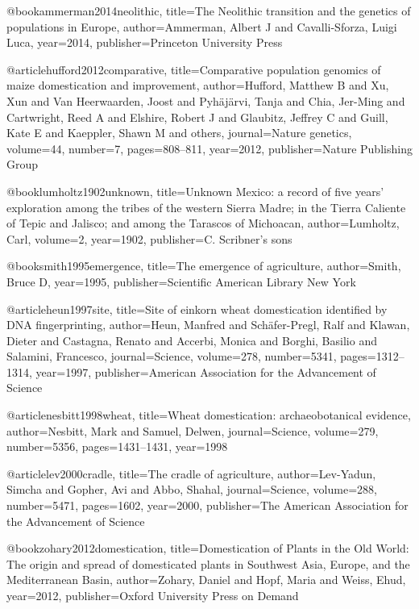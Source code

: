 @book{ammerman2014neolithic,
  title={The Neolithic transition and the genetics of populations in Europe},
  author={Ammerman, Albert J and Cavalli-Sforza, Luigi Luca},
  year={2014},
  publisher={Princeton University Press}
}

@article{hufford2012comparative,
  title={Comparative population genomics of maize domestication and improvement},
  author={Hufford, Matthew B and Xu, Xun and Van Heerwaarden, Joost and Pyh{\"a}j{\"a}rvi, Tanja and Chia, Jer-Ming and Cartwright, Reed A and Elshire, Robert J and Glaubitz, Jeffrey C and Guill, Kate E and Kaeppler, Shawn M and others},
  journal={Nature genetics},
  volume={44},
  number={7},
  pages={808--811},
  year={2012},
  publisher={Nature Publishing Group}
}

@book{lumholtz1902unknown,
  title={Unknown Mexico: a record of five years' exploration among the tribes of the western Sierra Madre; in the Tierra Caliente of Tepic and Jalisco; and among the Tarascos of Michoacan},
  author={Lumholtz, Carl},
  volume={2},
  year={1902},
  publisher={C. Scribner's sons}
}

@book{smith1995emergence,
  title={The emergence of agriculture},
  author={Smith, Bruce D},
  year={1995},
  publisher={Scientific American Library New York}
}

@article{heun1997site,
  title={Site of einkorn wheat domestication identified by DNA fingerprinting},
  author={Heun, Manfred and Sch{\"a}fer-Pregl, Ralf and Klawan, Dieter and Castagna, Renato and Accerbi, Monica and Borghi, Basilio and Salamini, Francesco},
  journal={Science},
  volume={278},
  number={5341},
  pages={1312--1314},
  year={1997},
  publisher={American Association for the Advancement of Science}
}

@article{nesbitt1998wheat,
  title={Wheat domestication: archaeobotanical evidence},
  author={Nesbitt, Mark and Samuel, Delwen},
  journal={Science},
  volume={279},
  number={5356},
  pages={1431--1431},
  year={1998}
}

@article{lev2000cradle,
  title={The cradle of agriculture},
  author={Lev-Yadun, Simcha and Gopher, Avi and Abbo, Shahal},
  journal={Science},
  volume={288},
  number={5471},
  pages={1602},
  year={2000},
  publisher={The American Association for the Advancement of Science}
}

@book{zohary2012domestication,
  title={Domestication of Plants in the Old World: The origin and spread of domesticated plants in Southwest Asia, Europe, and the Mediterranean Basin},
  author={Zohary, Daniel and Hopf, Maria and Weiss, Ehud},
  year={2012},
  publisher={Oxford University Press on Demand}
}

